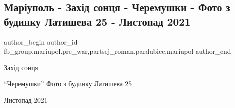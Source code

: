  
 
 
 
 

\subsection{Маріуполь - Захід сонця - Черемушки - Фото з будинку Латишева 25 - Листопад 2021}
\label{sec:23_01_2023.fb.fb_group.mariupol.pre_war.2.mar_upol___zakh_d_so}
 
\ifcmt
 author_begin
   author_id fb_group.mariupol.pre_war,partsej_roman.pardubice.mariupol
 author_end
\fi

Захід сонця

\enquote{Черемушки} Фото з будинку Латишева 25

Листопад 2021
